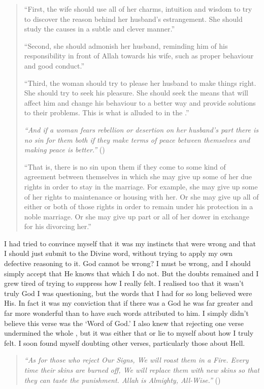 \documentclass[12pt]{memoir}
\begin{document}
\begin{quote}
“First, the wife should use all of her charms,
intuition and wisdom to try to discover the reason
behind her husband’s estrangement.
She should study the causes in a subtle and clever manner.”

“Second, she should admonish her husband,
reminding him of his responsibility in front of Allah towards his wife,
such as proper behaviour and good conduct.”

“Third, the woman should try to please her husband to make things right.
She should try to seek his pleasure.
She should seek the means that will affect him
and change his behaviour to a better way
and provide solutions to their problems.
This is what is alluded to in the \Quran.”

\emph{“And if a woman fears rebellion or desertion on her husband’s part
there is no sin for them both if they make terms of peace between themselves
and making peace is better.”} ()

“That is, there is no sin upon them if they come to some kind of agreement
between themselves in which she may give up some of her due rights
in order to stay in the marriage.
For example, she may give up some of her rights
to maintenance or housing with her.
Or she may give up all of either or both of those rights
in order to remain under his protection in a noble marriage.
Or she may give up part or all of her dower
in exchange for his divorcing her.”
\end{quote}

I had tried to convince myself that it was my instincts
that were wrong and that I should just submit to the Divine word,
without trying to apply my own defective reasoning to it.
God cannot be wrong?
I must be wrong, and I should simply accept
that He knows that which I do not.
But the doubts remained and I grew tired of trying
to suppress how I really felt.
I realised too that it wasn’t truly God I was questioning,
but the words that I had for so long believed were His.
In fact it was my conviction that if there was a God
he was far greater and far more wonderful
than to have such words attributed to him.
I simply didn’t believe this verse was the ‘Word of God.’
I also knew that rejecting one verse undermined the whole \Quran,
but it was either that or lie to myself about how I truly felt.
I soon found myself doubting other verses, particularly those about Hell.

\begin{quote}
\emph{%
“As for those who reject Our Signs, We will roast them in a Fire.
Every time their skins are burned off,
We will replace them with new skins so that they can taste the punishment.
Allah is Almighty, All-Wise.”} ()
\end{quote}
\end{document}

